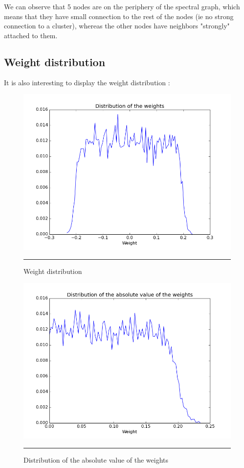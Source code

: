 We can observe that 5 nodes are on the periphery of the spectral graph, which means that they have small connection to the rest of the nodes (ie no strong connection to a cluster), whereas the other nodes have neighbors "strongly" attached to them. 

\subsection{Weight distribution}
It is also interesting to display the weight distribution : 

\begin{figure}[htbp]
    \centering
    \includegraphics[scale=0.4]{Figures/weight_distribution.png}
    \rule{35em}{0.5pt}
    \caption[Weight distribution ]{Weight distribution}
    \label{fig:weight_dist}
\end{figure}

\begin{figure}[htbp]
    \centering
    \includegraphics[scale=0.4]{Figures/abs_weight_distribution.png}
    \rule{35em}{0.5pt}
    \caption[Distribution of the absolute value of the weights]{Distribution of the absolute value of the weights}
    \label{fig:abs_weight_dist}
\end{figure}

